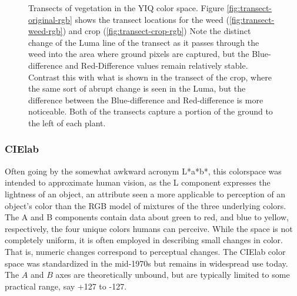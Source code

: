 \documentclass[letterpaper]{article}
\begin{document}
{\begin{figure}[h]
	\centering
	\hfill
	\hfill
	\caption[YIQ Transects]{Transects of vegetation in the YIQ color space. Figure \ref{fig:transect-original-rgb} shows the transect locations for the weed (\ref{fig:transect-weed-rgb}) and crop (\ref{fig:transect-crop-rgb}) Note the distinct change of the Luma line of the transect as it passes through the weed into the area where ground pixels are captured, but the Blue-difference and Red-Difference values remain relatively stable. Contrast this with what is shown in the transect of the crop, where the same sort of abrupt change is seen in the Luma, but the difference between the Blue-difference and Red-difference is more noticeable. Both of the transects capture a portion of the ground to the left of each plant.}
	\label{fig:transects-yiq}
\end{figure}


\subsubsection{CIElab}
Often going by the somewhat awkward acronym L*a*b*, this colorspace was intended to approximate human vision, as the L component expresses  the lightness of an object, an attribute seen a more applicable to perception of an object's color than the RGB model of mixtures of the three underlying colors.  The A and B components contain data about green to red, and blue to yellow, respectively, the four unique colors humans can perceive. While the space is not completely uniform, it is often employed in describing small changes in color. That is, numeric changes correspond to perceptual changes. The CIElab color space was standardized in the mid-1970s but remains in widespread use today. \parencite{Wikipedia_contributors2023-xt}  The $A$ and $B$ axes are theoretically unbound, but are typically limited to some practical range, say +127 to -127. 

}
\end{document}
